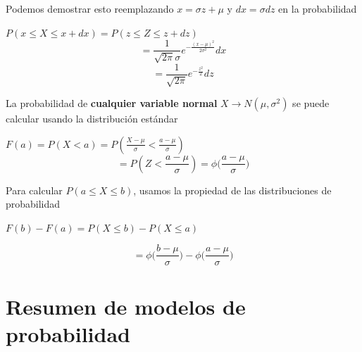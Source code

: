 \documentclass[
]{book}
\begin{document}
Podemos demostrar esto reemplazando \(x=\sigma z+\mu\) y \(dx=\sigma dz\) en la probabilidad

\(P(x\leq X \leq x +dx)=P(z\leq Z \leq z +dz)\)
\[=\frac{1}{\sqrt{2\pi}\sigma}e^{-\frac{(x-\mu)^2}{2\sigma^2}}dx\] \[=\frac{1}{ \sqrt{2\pi}}e^{-\frac{z^2}{2}} dz\]

La probabilidad de \textbf{cualquier variable normal} \(X\rightarrow N(\mu, \sigma^2)\) se puede calcular usando la distribución estándar

\(F(a)=P(X<a)=P(\frac{X-\mu}{\sigma}<\frac{a-\mu}{\sigma})\)
\[=P(Z < \frac{a-\mu}{\sigma})= \phi \big(\frac{a-\mu}{\sigma}\big)\]

Para calcular \(P(a\leq X \leq b)\), usamos la propiedad de las distribuciones de probabilidad

\(F(b)-F(a)=P(X\leq b)-P(X\leq a)\)

\[=\phi \big(\frac{b-\mu}{\sigma}\big)-\phi \big(\frac{a-\mu}{\sigma}\big)\]

\hypertarget{resumen-de-modelos-de-probabilidad}{%
\section{Resumen de modelos de probabilidad}\label{resumen-de-modelos-de-probabilidad}}
\end{document}
